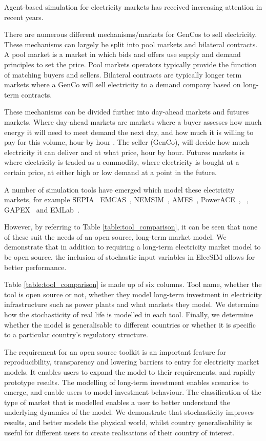 Agent-based simulation for electricity markets has received increasing attention in recent years. 

There are numerous different mechanisms/markets for GenCos to sell electricity. These mechanisms can largely be split into pool markets and bilateral contracts. A pool market is a market in which bids and offers use supply and demand principles to set the price. Pool markets operators typically provide the function of matching buyers and sellers. Bilateral contracts are typically longer term markets where a GenCo will sell electricity to a demand company based on long-term contracts. 

These mechanisms can be divided further into day-ahead markets and futures markets. Where day-ahead markets are markets where a buyer assesses how much energy it will need to meet demand the next day, and how much it is willing to pay for this volume, hour by hour \cite{nordpool_20192}. The seller (GenCo), will decide how much electricity it can deliver and at what price, hour by hour. Futures markets is where electricity is traded as a commodity, where electricity is bought at a certain price, at either high or low demand at a point in the future.

A number of simulation tools have emerged which model these electricity markets, for example SEPIA~\cite{Harp2000} EMCAS~\cite{Conzelmann}, NEMSIM~\cite{Batten2006}, AMES~\cite{Sun2007}, PowerACE~\cite{Rothengatter2007}, ~\cite{Praca2003}, GAPEX~\cite{Cincotti2013} and  EMLab~\cite{Chappin2017}. 

However, by referring to Table \ref{table:tool_comparison}, it can be seen that none of these suit the needs of an open source, long-term market model. We demonstrate that in addition to requiring a long-term electricity market model to be open source, the inclusion of stochastic input variables in ElecSIM allows for better performance. 

Table \ref{table:tool_comparison} is made up of six columns. Tool name, whether the tool is open source or not, whether they model long-term investment in electricity infrastructure such as power plants and what markets they model. We determine how the stochasticity of real life is modelled in each tool. Finally, we determine whether the model is generalisable to different countries or whether it is specific to a particular country's regulatory structure. 

The requirement for an open source toolkit is an important feature for reproducibility, transparency and lowering barriers to entry for electricity market models. It enables users to expand the model to their requirements, and rapidly prototype results. The modelling of long-term investment enables scenarios to emerge, and enable users to model investment behaviour. The classification of the type of market that is modelled enables a user to better understand the underlying dynamics of the model. We demonstrate that stochasticity improves results, and better models the physical world, whilst country generalisability is useful for different users to create realisations of their country of interest.

